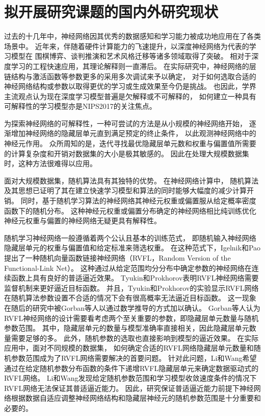 \section{拟开展研究课题的国内外研究现状}\label{sec:2.3}

过去的十几年中，神经网络因其优秀的数据感知和学习能力被成功地应用在了各类场景中\cite{cybenko1992approximation,chen1995universal}。
近年来，伴随着硬件计算能力的飞速提升，以深度神经网络为代表的学习模型在
围棋博弈\cite{silver2017mastering}、谈判推演\cite{lewis2017deal}和艺术风格迁移\cite{he2016powerful}等诸多领域取得了突破。
相对于深度学习的工程快速应用，其理论解释则一直滞后。
在实际研究中，神经网络的层链结构与激活函数等参数更多的采用多次调试来予以确定，
对于如何选取合适的神经网络结构或参数以取得更优的学习或生成效果至今仍是挑战。
也因此，学界主流观点认为现在深度学习模型普遍是欠解释或不可解释的，
如何建立一种具有可解释性的学习模型亦是NIPS2017的关注焦点。

为探索神经网络的可解释性，一种可尝试的方法是从小规模的神经网络开始，
逐渐增加神经网络的隐藏层单元直到满足预定的终止条件，
以此观测神经网络中的神经元作用\cite{kwok1997objective}。
众所周知的是，迭代寻找最优隐藏层单元数和权重与偏置值所需要的计算复杂度和开销对数据集的大小是极其敏感的。
因此在处理大规模数据集时，这种方法很难得以应用。

面对大规模数据集，随机算法具有其独特的优势\cite{mahoney2011randomized}。
在神经网络计算中，
随机算法及其思想已证明了其在建立快速学习模型和算法的同时能够大幅度的减少计算开销\cite{scardapane2017randomness,cui2016high}。
同时，基于随机学习算法的神经网络其神经元权重或偏置服从给定概率密度函数下的随机分布。
这种神经元权重或偏置分布确定的神经网络相比纯训练优化神经元权重与偏置的神经网络无疑更具有解释性。

随机学习神经网络一般遵循着两个公认且基本的训练范式，
即随机输入神经网络隐藏层单元的权重与偏置值和给定标准来筛选权重。
在这种范式下，Igelnik和Pao提出了一种随机向量函数链接神经网络（RVFL，Random Version of the Functional-Link Net）\cite{pao1992functional}。
这种通过从给定范围均分分布中确定参数的神经网络在连续函数上具有良好的普适逼近效果。
Tyukin和Prokhorov表明RVFL神经网络需要监督机制来更好逼近目标函数\cite{tyukin2009feasibility}。
并且，Tyukin和Prokhorov的实验显示RVFL网络在随机算法参数设置不合适的情况下会有很高概率无法逼近目标函数。
这一现象在随后的研究中被Gorban等人以通过数学推导的方式加以确认\cite{gorban2016approximation}。
Gorban等人认为RVFL神经网络的设计需要看考虑两个至关重要的参数，即隐藏层单元数量与随机参数范围。
其中，隐藏层单元的数量与模型准确率直接相关，因此隐藏层单元数量需要足够的多。
此外，随机参数的选取也直接影响到模型的逼近效果。
在实际应用中，面对不同规模的数据集，
如何确定合适的RVFL网络隐藏层单元数量和随机参数范围成为了RVFL网络需要解决的首要问题。
针对此问题，Li和Wang希望通过在给定随机参数分布函数的条件下递增RVFL隐藏层单元来确定数据驱动式的RVFL网络\cite{li2017insights}。
Li和Wang发现给定随机参数范围和学习模型收敛速度条件的情况下RVFL网络无法保证其普适逼近能力。
因此，研究保证普适逼近能力前提下神经网络根据数据自适应调整神经网络结构和隐藏层神经元的随机参数范围是十分重要和必要的。
